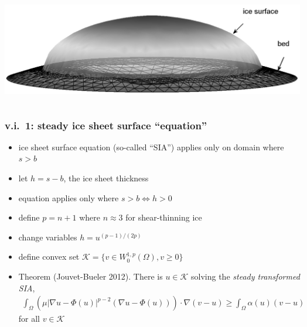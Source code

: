 \documentclass{beamer}
\newcommand{\Kcal}{\mathcal{K}}
\begin{document}
\begin{frame}
\begin{columns}
\begin{column}{0.6\textwidth}
\begin{center}
\bigskip
\includegraphics[width=\textwidth]{capnonflatobs}
\end{center}
\end{column}
\end{columns}
\end{frame}


\begin{frame}
  \frametitle{v.i.~1: steady ice sheet surface ``equation''} 

\begin{itemize}
\item ice sheet surface equation (so-called ``SIA'') applies only on domain where $s>b$
\item let $h=s-b$, the ice sheet thickness
\item equation applies only where $s > b \iff h > 0$
\item define $p = n+1$ where $n\approx 3$ for shear-thinning ice
\item change variables $h = u^{(p-1)/(2p)}$
\item define convex set $\Kcal = \{ v \in W^{1,p}_0 (\Omega), v \ge 0 \}$
\item Theorem (Jouvet-Bueler 2012).  There is $u \in \Kcal$ solving the \emph{steady transformed SIA},
\begin{align*}
\int_{\Omega}    \left( \mu  | \nabla u - \Phi(u) |^{p-2} 
( \nabla u - \Phi(u) )    \right)  \cdot \nabla ( v - u )  
\ge \int_{\Omega} \alpha(u) (  v -  u ) 
\end{align*}
for all $v \in \Kcal$
\end{itemize}
\end{frame}
\end{document}
